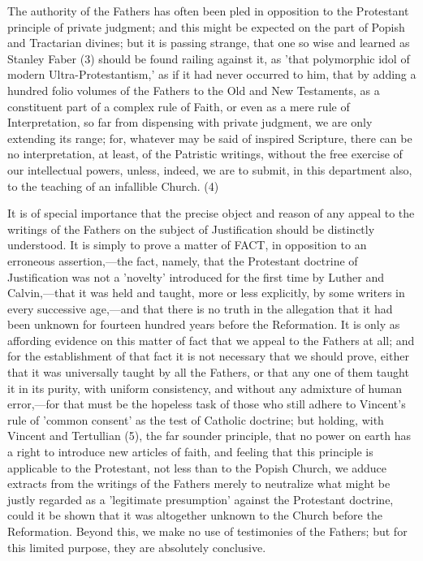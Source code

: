 \documentclass[
]{book}
\begin{document}
The authority of the Fathers has often been pled in opposition to the Protestant principle of private judgment; and this might be expected on the part of Popish and Tractarian divines; but it is passing strange, that one so wise and learned as Stanley Faber (3) should be found railing against it, as 'that polymorphic idol of modern Ultra-Protestantism,' as if it had never occurred to him, that by adding a hundred folio volumes of the Fathers to the Old and New Testaments, as a constituent part of a complex rule of Faith, or even as a mere rule of Interpretation, so far from dispensing with private judgment, we are only extending its range; for, whatever may be said of inspired Scripture, there can be no interpretation, at least, of the Patristic writings, without the free exercise of our intellectual powers, unless, indeed, we are to submit, in this department also, to the teaching of an infallible Church. (4)

It is of special importance that the precise object and reason of any appeal to the writings of the Fathers on the subject of Justification should be distinctly understood. It is simply to prove a matter of FACT, in opposition to an erroneous assertion,---the fact, namely, that the Protestant doctrine of Justification was not a 'novelty' introduced for the first time by Luther and Calvin,---that it was held and taught, more or less explicitly, by some writers in every successive age,---and that there is no truth in the allegation that it had been unknown for fourteen hundred years before the Reformation. It is only as affording evidence on this matter of fact that we appeal to the Fathers at all; and for the establishment of that fact it is not necessary that we should prove, either that it was universally taught by all the Fathers, or that any one of them taught it in its purity, with uniform consistency, and without any admixture of human error,---for that must be the hopeless task of those who still adhere to Vincent's rule of 'common consent' as the test of Catholic doctrine; but holding, with Vincent and Tertullian (5), the far sounder principle, that no power on earth has a right to introduce new articles of faith, and feeling that this principle is applicable to the Protestant, not less than to the Popish Church, we adduce extracts from the writings of the Fathers merely to neutralize what might be justly regarded as a 'legitimate presumption' against the Protestant doctrine, could it be shown that it was altogether unknown to the Church before the Reformation. Beyond this, we make no use of testimonies of the Fathers; but for this limited purpose, they are absolutely conclusive.
\end{document}

